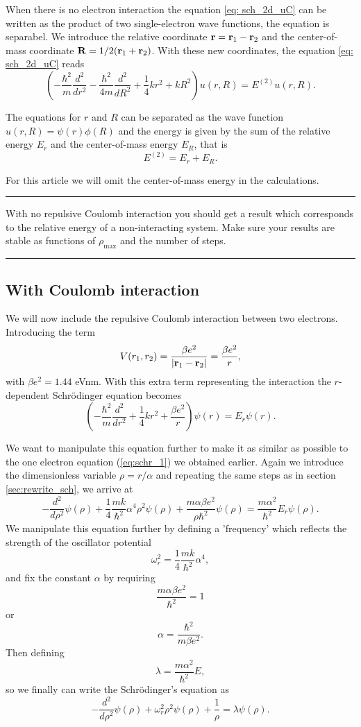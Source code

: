 \documentclass[11pt,a4wide]{article}
\begin{document}
When there is no electron interaction the equation \ref{eq: sch_2d_uC} can be written as the product of two single-electron wave functions, the equation is separabel. We introduce the relative coordinate ${\bf r} = {\bf r}_1-{\bf r}_2$ and the center-of-mass coordinate ${\bf R} = 1/2({\bf r}_1+{\bf r}_2)$. With these new coordinates, the equation \ref{eq: sch_2d_uC} reads
\[
\left(  -\frac{\hbar^2}{m} \frac{d^2}{dr^2} -\frac{\hbar^2}{4 m} \frac{d^2}{dR^2}+ \frac{1}{4} k r^2+  kR^2\right)u(r,R)  = E^{(2)} u(r,R).
\]

The equations for $r$ and $R$ can be separated as the wave function $u(r,R) = \psi(r)\phi(R)$ and the energy is given by the sum of the relative energy $E_r$ and the center-of-mass energy $E_R$, that is
\[
E^{(2)}=E_r+E_R.
\]

For this article we will omit the center-of-mass energy in the calculations.

\noindent\rule{\textwidth}{1pt}
With no repulsive Coulomb interaction 
you should get a result which corresponds to 
the relative energy of a non-interacting system.   
Make sure your results are 
stable as functions of $\rho_{\mathrm{max}}$ and the number of steps.
\noindent\rule{\textwidth}{1pt}

\subsection{With Coulomb interaction}
We will now include the repulsive Coulomb interaction between two electrons. Introducing the term
\[
V(r_1,r_2) = \frac{\beta e^2}{|{\bf r}_1-{\bf r}_2|}=\frac{\beta e^2}{r},
\]
with $\beta e^2=1.44$ eVnm. With this extra term representing the interaction the $r$-dependent Schr\"odinger equation becomes
\[
\left(  -\frac{\hbar^2}{m} \frac{d^2}{dr^2}+ \frac{1}{4}k r^2+\frac{\beta e^2}{r}\right)\psi(r)  = E_r \psi(r).
\]

We want to manipulate this equation further to make it as similar as possible to the one electron equation (\ref{eq:schr_1}) we obtained earlier. Again we introduce the dimensionless variable $\rho = r/\alpha$ and repeating the same steps as in section \ref{sec:rewrite_sch}, we arrive at 
\[
  -\frac{d^2}{d\rho^2} \psi(\rho) 
       + \frac{1}{4}\frac{mk}{\hbar^2} \alpha^4\rho^2\psi(\rho)+\frac{m\alpha \beta e^2}{\rho\hbar^2}\psi(\rho)  = 
\frac{m\alpha^2}{\hbar^2}E_r \psi(\rho) .
\]
We manipulate this equation further by defining a 'frequency' which reflects the strength of the oscillator potential
\[
\omega_r^2=\frac{1}{4}\frac{mk}{\hbar^2} \alpha^4,
\]
and fix the constant $\alpha$ by requiring 
\[
\frac{m\alpha \beta e^2}{\hbar^2}=1
\]
or 
\[
\alpha = \frac{\hbar^2}{m\beta e^2}.
\]
Then defining 
\[
\lambda = \frac{m\alpha^2}{\hbar^2}E,
\]
so we finally can write the Schr\"odinger's equation as
\begin{equation}
  -\frac{d^2}{d\rho^2} \psi(\rho) + \omega_r^2\rho^2\psi(\rho) +\frac{1}{\rho} = \lambda \psi(\rho).
  \label{eq: sch_2e_wCol}
\end{equation}
\end{document}
